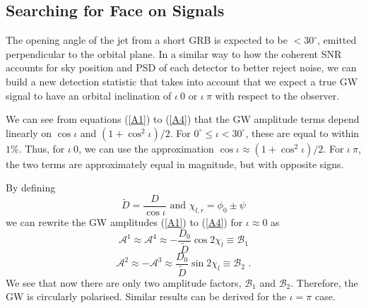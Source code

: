 \documentclass[11pt]{cuthesis}
\newcommand{\fs}{\text{ .}}
\begin{document}
\subsection{Searching for Face on Signals} \label{sec:circ pol}
The opening angle of the jet from a short GRB is expected to be $<30^\circ$, emitted perpendicular to the orbital plane. In a similar way to how the coherent SNR accounts for sky position and PSD of each detector to better reject noise, we can build a new detection statistic that takes into account that we expect a true GW signal to have an orbital inclination of $\iota ~ 0$ or $\iota ~ \pi$ with respect to the observer.

We can see from equations (\ref{A1}) to (\ref{A4}) that the GW amplitude terms depend linearly on $\cos\iota$ and $(1+\cos^2\iota)/2$. For $0^\circ\leq\iota<30^\circ$, these are equal to within $1\%$. Thus, for $\iota~0$, we can use the approximation $\cos\iota \approx (1+\cos^2\iota)/2$. For $\iota~\pi$, the two terms are approximately equal in magnitude, but with opposite signs. 

By defining 
\begin{equation}
\tilde{D} = \frac{D}{\cos\iota} \text{   and   } \chi_{l,r} = \phi_0 \pm \psi 
\end{equation}
we can rewrite the GW amplitudes  (\ref{A1}) to (\ref{A4}) for $\iota\approx 0$ as
\begin{equation}
\mathcal{A}^1 \approx \mathcal{A}^4 \approx -\frac{D_0}{\tilde{D}} \cos 2\chi_l \equiv \mathcal{B}_1
\end{equation}
\begin{equation}
\mathcal{A}^2 \approx -\mathcal{A}^3 \approx \frac{D_0}{\tilde{D}} \sin 2\chi_l \equiv \mathcal{B}_2 \fs
\end{equation}
We see that now there are only two amplitude factors, $\mathcal{B}_1$ and $\mathcal{B}_2$. Therefore, the GW is circularly polarised. Similar results can be derived for the $\iota=\pi$ case. 
\end{document}
